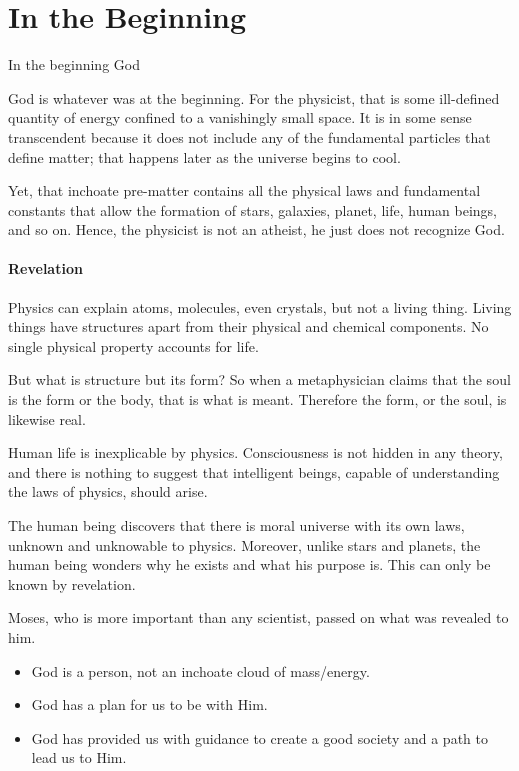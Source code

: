 \section{In the Beginning}

\begin{quotex}
In the beginning God 

\end{quotex}

God is whatever was at the beginning. For the physicist, that is some ill-defined quantity of energy confined to a
vanishingly small space. It is in some sense transcendent because it does not include any of the fundamental particles
that define matter; that happens later as the universe begins to cool.

Yet, that inchoate pre-matter contains all the physical laws and fundamental constants that allow the formation of
stars, galaxies, planet, life, human beings, and so on. Hence, the physicist is not an atheist, he just does not
recognize God.

\paragraph{Revelation}
Physics can explain atoms, molecules, even crystals, but not a living thing. Living things have structures apart from
their physical and chemical components. No single physical property accounts for life.

But what is structure but its form? So when a metaphysician claims that the soul is the form or the body, that is what
is meant. Therefore the form, or the soul, is likewise real.

Human life is inexplicable by physics. Consciousness is not hidden in any theory, and there is nothing to suggest that
intelligent beings, capable of understanding the laws of physics, should arise.

The human being discovers that there is moral universe with its own laws, unknown and unknowable to physics. Moreover,
unlike stars and planets, the human being wonders why he exists and what his purpose is. This can only be known by
revelation.

Moses, who is more important than any scientist, passed on what was revealed to him.

\begin{itemize}
\item God is a person, not an inchoate cloud of mass/energy. 
\item God has a plan for us to be with Him. 
\item God has provided us with guidance to create a good society and a path to lead us to Him. 
\end{itemize}

